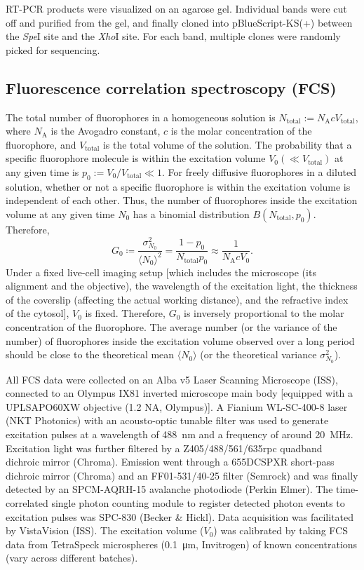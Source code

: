 RT-PCR products were visualized on an agarose gel. Individual bands were cut off and purified from the gel, and finally cloned into pBlueScript-KS(+) between the \textit{Spe}I site and the \textit{Xho}I site. For each band, multiple clones were randomly picked for sequencing.

\subsection{Fluorescence correlation spectroscopy (FCS)}
\label{FCSMethods}
The total number of fluorophores in a homogeneous solution is $N_\text{total} := N_\text{A}cV_\text{total}$, where $N_\text{A}$ is the Avogadro constant, $c$ is the molar concentration of the fluorophore, and $V_\text{total}$ is the total volume of the solution. The probability that a specific fluorophore molecule is within the excitation volume $V_0 (\ll V_\text{total})$ at any given time is
$p_0 := V_0/V_\text{total}\ll1$. For freely diffusive fluorophores in a diluted solution, whether or not a specific fluorophore is within the excitation volume is independent of each other. Thus, the number of fluorophores inside the excitation volume at any given time $N_0$ has a binomial distribution $B(N_\text{total}, p_0)$. Therefore,
\begin{equation*}
    G_0 \coloneqq \dfrac{\sigma_{N_0}^2}{\langle N_0 \rangle^2} = \dfrac{1-p_0}{N_\text{total}p_0} \approx \dfrac{1}{N_\text{A}cV_0}.
\end{equation*}
Under a fixed live-cell imaging setup [which includes the microscope (its alignment and the objective), the wavelength of the excitation light, the thickness of the coverslip (affecting the actual working distance), and the refractive index of the cytosol], $V_0$ is fixed. Therefore, $G_0$ is inversely proportional to the molar concentration of the fluorophore. The average number (or the variance of the number) of fluorophores inside the excitation volume observed over a long period should be close to the theoretical mean $\langle N_0 \rangle$ (or the theoretical variance $\sigma_{N_0}^2$).

All FCS data were collected on an Alba v5 Laser Scanning Microscope (ISS), connected to an Olympus IX81 inverted microscope main body [equipped with a UPLSAPO60XW objective (1.2 NA, Olympus)]. A Fianium WL-SC-400-8 laser (NKT Photonics) with an acousto-optic tunable filter was used to generate excitation pulses at a wavelength of \SI{488}{nm} and a frequency of around \SI{20}{MHz}. Excitation light was further filtered by a Z405/488/561/635rpc quadband dichroic mirror (Chroma). Emission went through a 655DCSPXR short-pass dichroic mirror (Chroma) and an FF01-531/40-25 filter (Semrock) and was finally detected by an SPCM-AQRH-15 avalanche photodiode (Perkin Elmer). The time-correlated single photon counting module to register detected photon events to excitation pulses was SPC-830 (Becker \& Hickl). Data acquisition was facilitated by VistaVision (ISS). The excitation volume ($V_0$) was calibrated by taking FCS data from TetraSpeck\texttrademark{} microspheres (\SI{0.1}{\micro m}, Invitrogen) of known concentrations (vary across different batches).

